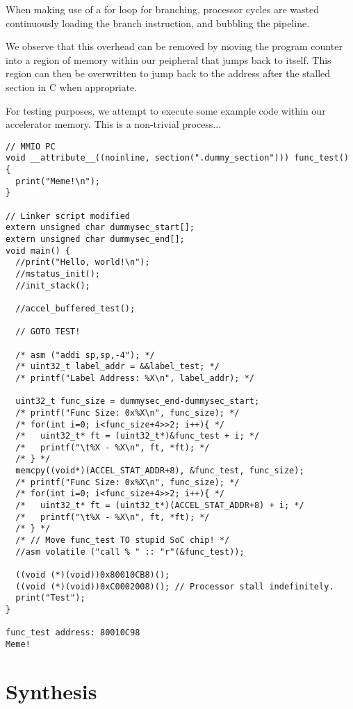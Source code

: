 \documentclass[a4paper,8pt]{report}
\begin{document}
When making use of a for loop for branching, processor cycles are wasted
continuously loading the branch instruction, and bubbling the pipeline.

We observe that this overhead can be removed by moving the program counter into
a region of memory within our peipheral that jumps back to itself. This region
can then be overwritten to jump back to the address after the stalled section in
C when appropriate.

For testing purposes, we attempt to execute some example code within our
accelerator memory. This is a non-trivial process...
\begin{verbatim}
// MMIO PC
void __attribute__((noinline, section(".dummy_section"))) func_test() {
  print("Meme!\n");
}

// Linker script modified
extern unsigned char dummysec_start[];
extern unsigned char dummysec_end[];
void main() {
  //print("Hello, world!\n");
  //mstatus_init();
  //init_stack();

  //accel_buffered_test();

  // GOTO TEST!

  /* asm ("addi sp,sp,-4"); */
  /* uint32_t label_addr = &&label_test; */
  /* printf("Label Address: %X\n", label_addr); */

  uint32_t func_size = dummysec_end-dummysec_start;
  /* printf("Func Size: 0x%X\n", func_size); */
  /* for(int i=0; i<func_size+4>>2; i++){ */
  /*   uint32_t* ft = (uint32_t*)&func_test + i; */
  /*   printf("\t%X - %X\n", ft, *ft); */
  /* } */
  memcpy((void*)(ACCEL_STAT_ADDR+8), &func_test, func_size);
  /* printf("Func Size: 0x%X\n", func_size); */
  /* for(int i=0; i<func_size+4>>2; i++){ */
  /*   uint32_t* ft = (uint32_t*)(ACCEL_STAT_ADDR+8) + i; */
  /*   printf("\t%X - %X\n", ft, *ft); */
  /* } */
  /* // Move func_test TO stupid SoC chip! */
  //asm volatile ("call % " :: "r"(&func_test));

  ((void (*)(void))0x80010CB8)();
  ((void (*)(void))0xC0002008)(); // Processor stall indefinitely.
  print("Test");
}

func_test address: 80010C98
Meme!
\end{verbatim}









\section{Synthesis}
\end{document}
